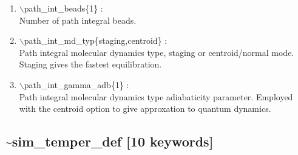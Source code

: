 \documentclass[12pt,titlepage]{article}
\begin{document}
\begin{enumerate}

 \vspace{0.15in} 
 \item  $\backslash$path\_int\_beads\{1\} : \\
     Number of path integral beads.

 \vspace{0.15in} 
 \item  $\backslash$path\_int\_md\_typ\{staging,centroid\} : \\
     Path integral molecular dynamics type, staging or centroid/normal mode.
     Staging gives the fastest equilibration.

 \vspace{0.15in} 
 \item  $\backslash$path\_int\_gamma\_adb\{1\} : \\
     Path integral molecular dynamics type adiabaticity parameter.
     Employed with the centroid option to give approxation to quantum dynamics.




\end{enumerate}

\newpage
\newpage
\subsection*{\bf \~{}sim\_temper\_def [10 keywords]}
\end{document}
